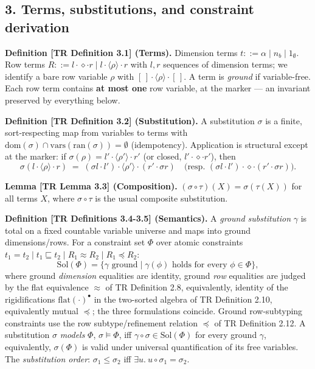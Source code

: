 \documentclass[
  10pt,
  letterpaper,
]{article}
\begin{document}
\subsection{3. Terms, substitutions, and constraint
derivation}\label{terms-substitutions-and-constraint-derivation}

\textbf{Definition {[}TR Definition 3.1{]} (Terms).} Dimension terms
\(t ::= \alpha \mid n_b \mid 1_\emptyset\). Row terms
\(R ::= l \cdot \diamond \cdot r \mid l \cdot \langle\rho\rangle \cdot r\)
with \(l, r\) sequences of dimension terms; we identify a bare row
variable \(\rho\) with \([\,]\cdot\langle\rho\rangle\cdot[\,]\). A term
is \emph{ground} if variable-free. Each row term contains \textbf{at
most one} row variable, at the marker --- an invariant preserved by
everything below.

\textbf{Definition {[}TR Definition 3.2{]} (Substitution).} A
substitution \(\sigma\) is a finite, sort-respecting map from variables
to terms with
\(\mathrm{dom}(\sigma) \cap \mathrm{vars}(\mathrm{ran}(\sigma)) = \emptyset\)
(idempotency). Application is structural except at the marker: if
\(\sigma(\rho) = l' \cdot \langle\rho'\rangle \cdot r'\) (or closed,
\(l'\cdot\diamond\cdot r'\)), then
\[\sigma(l \cdot \langle\rho\rangle \cdot r) \;=\; (\sigma l \cdot l') \cdot \langle\rho'\rangle \cdot (r' \cdot \sigma r) \quad\big(\text{resp. } (\sigma l \cdot l') \cdot \diamond \cdot (r' \cdot \sigma r)\big).\]

\textbf{Lemma {[}TR Lemma 3.3{]} (Composition).}
\((\sigma \circ \tau)(X) = \sigma(\tau(X))\) for all terms \(X\), where
\(\sigma \circ \tau\) is the usual composite substitution.

\textbf{Definition {[}TR Definitions 3.4-3.5{]} (Semantics).} A
\emph{ground substitution} \(\gamma\) is total on a fixed countable
variable universe and maps into ground dimensions/rows. For a constraint
set \(\Phi\) over atomic constraints
\(t_1 = t_2 \mid t_1 \sqsubseteq t_2 \mid R_1 \approx R_2 \mid R_1 \preceq R_2\):
\[\mathrm{Sol}(\Phi) = \{\gamma \text{ ground} \mid \gamma(\phi) \text{ holds for every } \phi \in \Phi\},\]
where ground \emph{dimension} equalities are identity, ground \emph{row}
equalities are judged by the flat equivalence \(\approx\) of TR
Definition 2.8, equivalently, identity of the rigidifications
\(\mathrm{flat}(\cdot)^\bullet\) in the two-sorted algebra of TR
Definition 2.10, equivalently mutual \(\preceq\); the three formulations
coincide. Ground row-subtyping constraints use the row
subtype/refinement relation \(\preceq\) of TR Definition 2.12. A
substitution \(\sigma\) \emph{models} \(\Phi\), \(\sigma \models \Phi\),
iff \(\gamma \circ \sigma \in \mathrm{Sol}(\Phi)\) for every ground
\(\gamma\), equivalently, \(\sigma(\Phi)\) is valid under universal
quantification of its free variables. The \emph{substitution order}:
\(\sigma_1 \le \sigma_2\) iff
\(\exists u.\ u \circ \sigma_1 = \sigma_2\).
\end{document}
